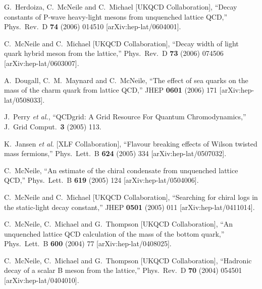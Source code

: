 \begin{thebibliography}{130}
  G.~Herdoiza, C.~McNeile and C.~Michael  [UKQCD Collaboration],
  ``Decay constants of P-wave heavy-light mesons from unquenched lattice
  QCD,''
  Phys.\ Rev.\ D {\bf 74} (2006) 014510
  [arXiv:hep-lat/0604001].

  C.~McNeile and C.~Michael  [UKQCD Collaboration],
  ``Decay width of light quark hybrid meson from the lattice,''
  Phys.\ Rev.\ D {\bf 73} (2006) 074506
  [arXiv:hep-lat/0603007].

  A.~Dougall, C.~M.~Maynard and C.~McNeile,
  ``The effect of sea quarks on the mass of the charm quark from lattice
  QCD,''
  JHEP {\bf 0601} (2006) 171
  [arXiv:hep-lat/0508033].

  J.~Perry {\it et al.},
  ``QCDgrid: A Grid Resource For Quantum Chromodynamics,''
  J.\ Grid Comput.\  {\bf 3} (2005) 113.

K.~Jansen {\it et al.}  [XLF Collaboration],
``Flavour breaking effects of Wilson twisted mass fermions,''
Phys.\ Lett.\ B {\bf 624} (2005) 334
[arXiv:hep-lat/0507032].


C.~McNeile,
``An estimate of the chiral condensate from unquenched lattice QCD,''
Phys.\ Lett.\ B {\bf 619} (2005) 124
[arXiv:hep-lat/0504006].


C.~McNeile and C.~Michael  [UKQCD Collaboration],
``Searching for chiral logs in the static-light decay constant,''
JHEP {\bf 0501} (2005) 011
[arXiv:hep-lat/0411014].


C.~McNeile, C.~Michael and G.~Thompson  [UKQCD Collaboration],
``An unquenched lattice QCD calculation of the mass of the bottom
quark,''
Phys.\ Lett.\ B {\bf 600} (2004) 77
[arXiv:hep-lat/0408025].


C.~McNeile, C.~Michael and G.~Thompson  [UKQCD Collaboration],
``Hadronic decay of a scalar B meson from the lattice,''
Phys.\ Rev.\ D {\bf 70} (2004) 054501
[arXiv:hep-lat/0404010].




\end{thebibliography}
